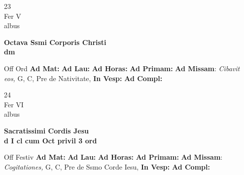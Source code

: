 \documentclass[10pt, openany]{book}
\begin{document}
    \begin{center}
        \begin{minipage}{3.5in}
            \vspace{2em}
            \begin{minipage}{0.5in}
                {\Huge 23} \\
                {\normalsize Fer V} \\
                {\normalsize albus}
            \end{minipage}
            \begin{minipage}{3.0in}
                \textbf{ \large Octava Ssmi Corporis Christi \\
                \textnormal{\normalsize dm}} \\ 
            \end{minipage}
            \begin{justify}Off Ord
                \textbf{Ad Mat: }
                \textbf{Ad Lau: }
                \textbf{Ad Horas: }
                \textbf{Ad Primam: }\textbf{Ad Missam}: \textit{Cibavit eos,} G, C, Pre de Nativitate,  
                \textbf{In Vesp: }
                \textbf{Ad Compl: }
            \end{justify}
        \end{minipage}
    \end{center}

    \begin{center}
        \begin{minipage}{3.5in}
            \vspace{2em}
            \begin{minipage}{0.5in}
                {\Huge 24} \\
                {\normalsize Fer VI} \\
                {\normalsize albus}
            \end{minipage}
            \begin{minipage}{3.0in}
                \textbf{ \large Sacratissimi Cordis Jesu \\
                \textnormal{\normalsize d I cl cum Oct privil 3 ord}} \\ 
            \end{minipage}
            \begin{justify}Off Festiv
                \textbf{Ad Mat: }
                \textbf{Ad Lau: }
                \textbf{Ad Horas: }
                \textbf{Ad Primam: }\textbf{Ad Missam}: \textit{Cogitationes,} G, C, Pre de Ssmo Corde Iesu,  
                \textbf{In Vesp: }
                \textbf{Ad Compl: }
            \end{justify}
        \end{minipage}
    \end{center}
\end{document}
